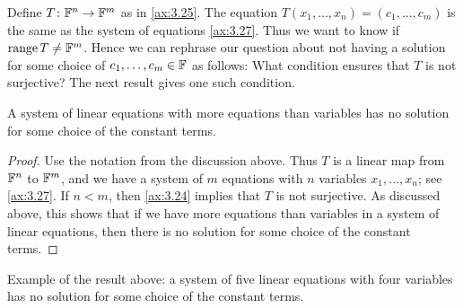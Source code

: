%
Define $T\colon\mathbb{F}^n\to\mathbb{F}^m$ as in \ref{ax:3.25}. The equation
$T(x_1,\dots,x_n)=(c_1,\dots,c_m)$ is the same as the system of equations
\ref{ax:3.27}. Thus we want to know if $\operatorname{range} T\ne\mathbb{F}^m$. Hence we can
rephrase our question about not having a solution for some choice of
$c_1,\dots,c_m\in\mathbb{F}$ as follows: What condition ensures that $T$ is not
surjective? The next result gives one such condition.

\begin{result}\label{ax:3.28}
A system of linear equations with more equations than variables has no
solution for some choice of the constant terms.
\end{result}

\begin{proof}
Use the notation from the discussion above. Thus $T$ is a linear map from
$\mathbb{F}^n$ to $\mathbb{F}^m$, and we have a system of $m$ equations with $n$ variables
$x_1,\dots,x_n$; see \ref{ax:3.27}. If $n<m$, then \ref{ax:3.24} implies that
$T$ is not surjective. As discussed above, this shows that if we have more
equations than variables in a system of linear equations, then there is no
solution for some choice of the constant terms.
\end{proof}

Example of the result above: a system of five linear equations with four
variables has no solution for some choice of the constant terms.

